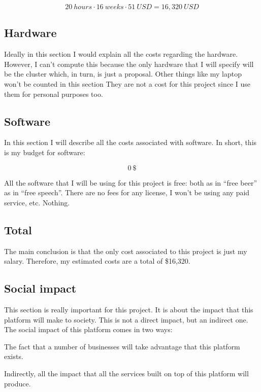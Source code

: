 \[
  20\ hours \cdot 16\ weeks \cdot 51\ USD = 16,320\ USD
\]


\subsection{Hardware}

Ideally in this section I would explain all the costs regarding the hardware.
However, I can't compute this because the only hardware that I will specify will
be the cluster which, in turn, is just a proposal. Other things like my laptop
won't be counted in this section They are not a cost for this project since I
use them for personal purposes too.

\subsection{Software}

In this section I will describe all the costs associated with software. In
short, this is my budget for software:

\[
  0\ \$
\]

All the software that I will be using for this project is free: both as in
``free beer'' as in ``free speech''. There are no fees for any license, I won't
be using any paid service, etc. Nothing.

\subsection{Total}

The main conclusion is that the only cost associated to this project is just my
salary. Therefore, my estimated costs are a total of \$16,320.

\subsection{Social impact}

This section is really important for this project. It is about the impact that
this platform will make to society. This is not a direct impact, but an
indirect one. The social impact of this platform comes in two ways:

\mylist
  \item The fact that a number of businesses will take advantage that this
platform exists.
  \item Indirectly, all the impact that all the services built on top of this
platform will produce.
\mylistend

